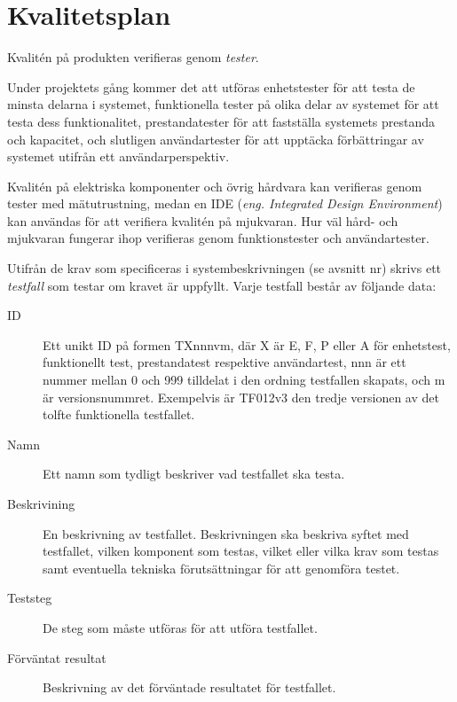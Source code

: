 \documentclass[a4paper]{article}
\begin{document}
\section*{Kvalitetsplan}

Kvalitén på produkten verifieras genom \textit{tester}.

Under projektets gång kommer det att utföras enhetstester för att testa de minsta delarna i systemet, funktionella tester på olika delar av systemet för att testa dess funktionalitet, prestandatester för att fastställa systemets prestanda och kapacitet, och slutligen användartester för att upptäcka förbättringar av systemet utifrån ett användarperspektiv.

Kvalitén på elektriska komponenter och övrig hårdvara kan verifieras genom tester med mätutrustning, medan en IDE (\textit{eng. Integrated Design Environment}) kan användas för att verifiera kvalitén på mjukvaran. Hur väl hård- och mjukvaran fungerar ihop verifieras genom funktionstester och användartester.

Utifrån de krav som specificeras i systembeskrivningen (se avsnitt nr) skrivs ett \textit{testfall} som testar om kravet är uppfyllt. Varje testfall består av följande data:

\begin{description}
  \item [ID] Ett unikt ID på formen TXnnnvm, där X är E, F, P eller A för enhetstest, funktionellt test, prestandatest respektive användartest, nnn är ett nummer mellan 0 och 999 tilldelat i den ordning testfallen skapats, och m är versionsnummret. Exempelvis är TF012v3 den tredje versionen av det tolfte funktionella testfallet.
  \item [Namn] Ett namn som tydligt beskriver vad testfallet ska testa.
  \item [Beskrivining] En beskrivning av testfallet. Beskrivningen ska beskriva syftet med testfallet, vilken komponent som testas, vilket eller vilka krav som testas samt eventuella tekniska förutsättningar för att genomföra testet.
  \item [Teststeg] De steg som måste utföras för att utföra testfallet.
  \item [Förväntat resultat] Beskrivning av det förväntade resultatet för testfallet.
\end{description}
\end{document}
